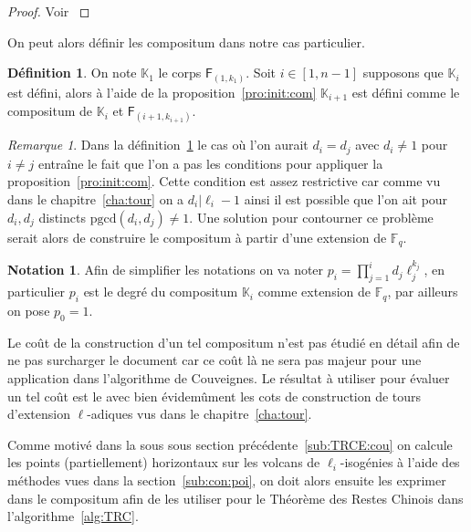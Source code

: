 \documentclass[10pt,a4paper]{book}
\theoremstyle{plain}
\theoremstyle{definition}
\theoremstyle{definition}
\theoremstyle{definition}
\theoremstyle{definition}
\newtheorem{defi}[thm]{Définition}
\theoremstyle{remark}
\newtheorem{rem}[thm]{Remarque}
\theoremstyle{remark}
\theoremstyle{definition}
\newtheorem{nota}[thm]{Notation}
\begin{document}
\begin{proof}
Voir \cite[Theorem 2]{BrawleyCarlitz87}
\end{proof}


On peut alors définir les compositum dans notre cas particulier.
\begin{defi}
\label{def:con:com}
On note $\mathbb{K}_1$ le corps $\mathsf{F}_{(1,k_1)}$. Soit $i \in [1,n-1]$ 
supposons que $\mathbb{K}_{i}$ est défini, alors à 
l'aide de la proposition~\ref{pro:init:com} $\mathbb{K}_{i+1}$ est défini comme
le compositum de $\mathbb{K}_i$ et $\mathsf{F}_{(i+1,k_{i+1})}$.
\end{defi}
\begin{rem}
Dans la définition~\ref{def:con:com} le cas où l'on aurait $d_i=d_j$ avec $d_i 
\neq 1$ pour $i \neq j$ entraîne le fait que l'on a pas
les conditions pour appliquer la proposition~\ref{pro:init:com}. 
Cette condition est assez restrictive car comme vu dans le 
chapitre~\ref{cha:tour} on a $d_i | \ell_i-1$ ainsi il est possible que l'on
ait pour $d_i,d_j$ distincts $\mathrm{pgcd}(d_i,d_j) \neq 1$. Une 
solution pour contourner ce problème serait alors de construire le compositum à
partir d'une extension de $\mathbb{F}_q$.
\end{rem}


\begin{nota} Afin de simplifier les notations on va 
 noter $p_{i}=\prod_{j=1}^{i}d_j\ell_j^{k_j}$, en particulier $p_{i}$ est le 
 degré du compositum $\mathbb{K}_i$ comme extension de $\mathbb{F}_q$, par 
 ailleurs on pose $p_0=1$.
\end{nota}

Le coût de la construction d'un tel compositum n'est pas étudié en détail afin 
de ne pas surcharger le document car ce coût là ne sera pas majeur pour 
une application dans l'algorithme de Couveignes. Le résultat à utiliser pour 
évaluer un tel coût est le \cite[Theorem 1]{BostanFlajoletSalvySchost06} avec 
bien évidemûment les cots de construction de tours d'extension $\ell$-adiques 
vus dans le chapitre~\ref{cha:tour}.



 Comme motivé dans la sous sous section précédente~\ref{sub:TRCE:cou} on
 calcule les points (partiellement) horizontaux sur les volcans de 
 $\ell_i$-isogénies à l'aide des méthodes vues dans la 
 section~\ref{sub:con:poi}, on doit alors ensuite les exprimer dans le
 compositum afin de les utiliser pour le Théorème des Restes Chinois dans 
 l'algorithme~\ref{alg:TRC}.
  
\end{document}
